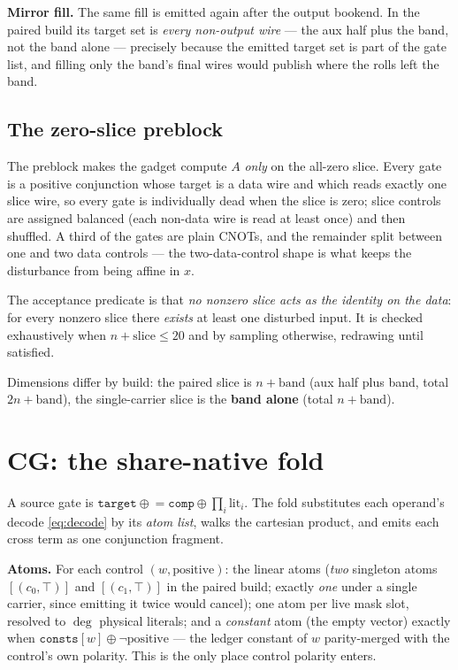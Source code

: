 \documentclass[11pt]{article}
\newcommand{\xor}{\oplus}
\newcommand{\code}[1]{\texttt{#1}}
\begin{document}
\textbf{Mirror fill.} The same fill is emitted again after the output bookend.
In the paired build its target set is \emph{every non-output wire} --- the aux
half plus the band, not the band alone --- precisely because the emitted target
set is part of the gate list, and filling only the band's final wires would
publish where the rolls left the band.

\subsection{The zero-slice preblock}

The preblock makes the gadget compute $A$ \emph{only} on the all-zero slice.
Every gate is a positive conjunction whose target is a data wire and which
reads exactly one slice wire, so every gate is individually dead when the slice
is zero; slice controls are assigned balanced (each non-data wire is read at
least once) and then shuffled. A third of the gates are plain CNOTs, and the
remainder split between one and two data controls --- the two-data-control
shape is what keeps the disturbance from being affine in $x$.

The acceptance predicate is that \emph{no nonzero slice acts as the identity on
the data}: for every nonzero slice there \emph{exists} at least one disturbed
input. It is checked exhaustively when $n + \text{slice} \le 20$ and by
sampling otherwise, redrawing until satisfied.

Dimensions differ by build: the paired slice is $n + \text{band}$ (aux half
plus band, total $2n+\text{band}$), the single-carrier slice is the
\textbf{band alone} (total $n+\text{band}$).

\section{CG: the share-native fold}

A source gate is $\code{target} \mathrel{\xor}= \code{comp} \xor \prod_i
\mathrm{lit}_i$. The fold substitutes each operand's decode
\eqref{eq:decode} by its \emph{atom list}, walks the cartesian product, and
emits each cross term as one conjunction fragment.

\textbf{Atoms.} For each control $(w,\text{positive})$: the linear atoms
(\emph{two} singleton atoms $[(c_0,\top)]$ and $[(c_1,\top)]$ in the paired
build; exactly \emph{one} under a single carrier, since emitting it twice would
cancel); one atom per live mask slot, resolved to $\deg$ physical literals; and
a \emph{constant} atom (the empty vector) exactly when
$\code{consts}[w] \xor \lnot\text{positive}$ --- the ledger constant of $w$
parity-merged with the control's own polarity. This is the only place control
polarity enters.
\end{document}
